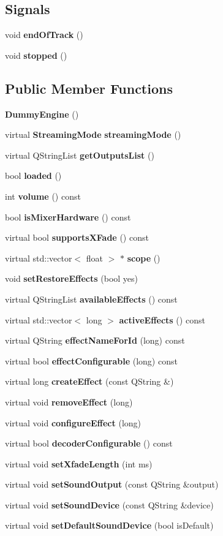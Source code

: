 \subsection*{Signals}
\begin{CompactItemize}
\item 
void {\bf end\-Of\-Track} ()
\item 
void {\bf stopped} ()
\end{CompactItemize}
\subsection*{Public Member Functions}
\begin{CompactItemize}
\item 
{\bf Dummy\-Engine} ()
\item 
virtual {\bf Streaming\-Mode} {\bf streaming\-Mode} ()
\item 
virtual QString\-List {\bf get\-Outputs\-List} ()
\item 
bool {\bf loaded} ()
\item 
int {\bf volume} () const 
\item 
bool {\bf is\-Mixer\-Hardware} () const 
\item 
virtual bool {\bf supports\-XFade} () const 
\item 
virtual std::vector$<$ float $>$ $\ast$ {\bf scope} ()
\item 
void {\bf set\-Restore\-Effects} (bool yes)
\item 
virtual QString\-List {\bf available\-Effects} () const 
\item 
virtual std::vector$<$ long $>$ {\bf active\-Effects} () const 
\item 
virtual QString {\bf effect\-Name\-For\-Id} (long) const 
\item 
virtual bool {\bf effect\-Configurable} (long) const 
\item 
virtual long {\bf create\-Effect} (const QString \&)
\item 
virtual void {\bf remove\-Effect} (long)
\item 
virtual void {\bf configure\-Effect} (long)
\item 
virtual bool {\bf decoder\-Configurable} () const 
\item 
virtual void {\bf set\-Xfade\-Length} (int ms)
\item 
virtual void {\bf set\-Sound\-Output} (const QString \&output)
\item 
virtual void {\bf set\-Sound\-Device} (const QString \&device)
\item 
virtual void {\bf set\-Default\-Sound\-Device} (bool is\-Default)
\end{CompactItemize}
